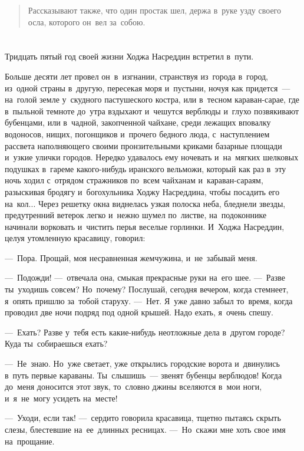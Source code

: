 \documentclass[12pt,a4paper]{book}
\begin{document}
\begin{quote}
Рассказывают также, что один простак шел, держа в~руке узду своего осла, которого он~вел за~собою.
\end{quote}

\chapter{}

Тридцать пятый год своей жизни Ходжа Насреддин встретил в~пути.

Больше десяти лет провел он~в~изгнании, странствуя из~города в~город, из~одной страны в~другую, пересекая моря и~пустыни, ночуя как придется~— на~голой земле у~скудного пастушеского костра, или в~тесном караван-сарае, где в~пыльной темноте до~утра вздыхают и~чешутся верблюды и~глухо позвякивают бубенцами, или в~чадной, закопченной чайхане, среди лежащих вповалку водоносов, нищих, погонщиков и~прочего бедного люда, с~наступлением рассвета наполняющего своими пронзительными криками базарные площади и~узкие улички городов. Нередко удавалось ему ночевать и~на~мягких шелковых подушках в~гареме какого-нибудь иранского вельможи, который как раз в~эту ночь ходил с~отрядом стражников по~всем чайханам и~караван-сараям, разыскивая бродягу и~богохульника Ходжу Насреддина, чтобы посадить его на~кол... Через решетку окна виднелась узкая полоска неба, бледнели звезды, предутренний ветерок легко и~нежно шумел по~листве, на~подоконнике начинали ворковать и~чистить перья веселые горлинки. И~Ходжа Насреддин, целуя утомленную красавицу, говорил:

—~Пора. Прощай, моя несравненная жемчужина, и~не~забывай меня.

—~Подожди! —~отвечала она, смыкая прекрасные руки на~его шее. —~Разве ты~уходишь совсем? Но~почему? Послушай, сегодня вечером, когда стемнеет, я~опять пришлю за~тобой старуху. —~Нет. Я~уже давно забыл то~время, когда проводил две ночи подряд под одной крышей. Надо ехать, я~очень спешу.

—~Ехать? Разве у~тебя есть какие-нибудь неотложные дела в~другом городе? Куда ты~собираешься ехать?

—~Не~знаю. Но~уже светает, уже открылись городские ворота и~двинулись в~путь первые караваны. Ты~слышишь~— звенят бубенцы верблюдов! Когда до~меня доносится этот звук, то~словно джины вселяются в~мои ноги, и~я~не~могу усидеть на~месте!

—~Уходи, если так! —~сердито говорила красавица, тщетно пытаясь скрыть слезы, блестевшие на~ее~длинных ресницах. —~Но~скажи мне хоть свое имя на~прощание.
\end{document}
